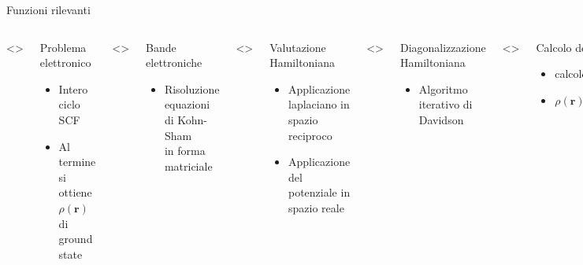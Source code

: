 \documentclass[8pt]{beamer}
\newcommand\dens{\rho(\mathbf{r})}
\newcommand\erre{\mathbf{r}}
\begin{document}
\begin{frame}{Funzioni rilevanti}
{\begin{minipage}[t][0.5\textheight][t]{\textwidth}
\begin{columns}
				\only<\electronsPos>{
					\begin{block}{Problema elettronico} 
						\begin{itemize}
							\item Intero ciclo SCF
							\item Al termine si ottiene $\dens$ di ground state
					\end{itemize}
					\end{block}
				}
				\only<\cegtergPos>{
					\begin{block}{Bande elettroniche} 
						\begin{itemize}
							\item Risoluzione equazioni di Kohn-Sham\\in forma matriciale
					\end{itemize}
					\end{block}
				}
				\only<\hpsiPos>{
					\begin{block}{Valutazione Hamiltoniana} 
						\begin{itemize}
							\item Applicazione laplaciano in spazio reciproco
							\item Applicazione del potenziale in spazio reale
						\end{itemize}
					\end{block}
				}
				\only<\cdiaghgPos>{
					\begin{block}{Diagonalizzazione Hamiltoniana} 
						\begin{itemize}
							\item Algoritmo iterativo di Davidson
						\end{itemize}
					\end{block}
				}
				\only<\sumbandPos>{
					\begin{block}{Calcolo densit\`a elettronica} 
						\begin{itemize}
							\item calcolo occupazione orbitali
							\item $\displaystyle \dens = \sum_{i} f_{\psi_{i}} ~ \psi_{i}^{*KS}(\erre) ~ \psi_{i}^{KS}(\erre)$
						\end{itemize}
					\end{block}
				}
				\only<\fftPos,\fftscatterPos>{
					\begin{block}{Moduli generici} 
						\begin{itemize}
							\visible<\fftPos,\fftscatterPos>{\item Calcolo FFT}
							\visible<\fftscatterPos>{\item Distribuzione griglia}


\end{itemize}
\end{block}}
\end{columns}
\end{minipage}}
\end{frame}
\end{document}
